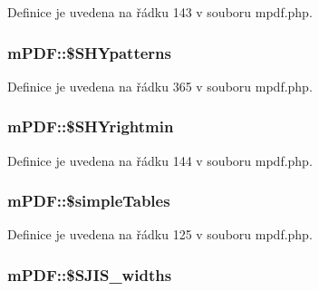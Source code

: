 Definice je uvedena na řádku 143 v souboru mpdf.\-php.

\hypertarget{classm_p_d_f_a4fe3b2deea6f8dc98af37940a76e09f3}{
\subsubsection[{\$\-S\-H\-Ypatterns}]{\setlength{\rightskip}{0pt plus 5cm}m\-P\-D\-F\-::\$\-S\-H\-Ypatterns}}\label{classm_p_d_f_a4fe3b2deea6f8dc98af37940a76e09f3}


Definice je uvedena na řádku 365 v souboru mpdf.\-php.

\hypertarget{classm_p_d_f_a0f5c175368b90bd077c4aaae934a1c87}{
\subsubsection[{\$\-S\-H\-Yrightmin}]{\setlength{\rightskip}{0pt plus 5cm}m\-P\-D\-F\-::\$\-S\-H\-Yrightmin}}\label{classm_p_d_f_a0f5c175368b90bd077c4aaae934a1c87}


Definice je uvedena na řádku 144 v souboru mpdf.\-php.

\hypertarget{classm_p_d_f_a9aa42365f1546ed49f789d0900f0e78d}{
\subsubsection[{\$simple\-Tables}]{\setlength{\rightskip}{0pt plus 5cm}m\-P\-D\-F\-::\$simple\-Tables}}\label{classm_p_d_f_a9aa42365f1546ed49f789d0900f0e78d}


Definice je uvedena na řádku 125 v souboru mpdf.\-php.

\hypertarget{classm_p_d_f_a7ef272985aed0a059a8c046f86a4b69f}{
\subsubsection[{\$\-S\-J\-I\-S\-\_\-widths}]{\setlength{\rightskip}{0pt plus 5cm}m\-P\-D\-F\-::\$\-S\-J\-I\-S\-\_\-widths}}\label{classm_p_d_f_a7ef272985aed0a059a8c046f86a4b69f}


